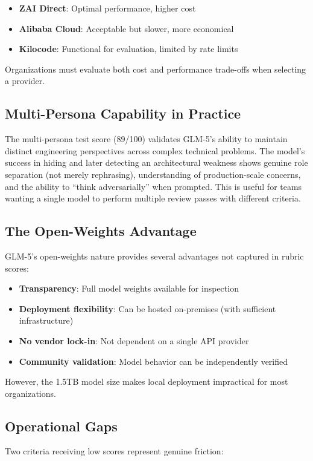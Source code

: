 \documentclass[conference]{IEEEtran}
\begin{document}
\begin{itemize}
    \item \textbf{ZAI Direct}: Optimal performance, higher cost
    \item \textbf{Alibaba Cloud}: Acceptable but slower, more economical
    \item \textbf{Kilocode}: Functional for evaluation, limited by rate limits
\end{itemize}

Organizations must evaluate both cost and performance trade-offs when selecting a provider.

\subsection{Multi-Persona Capability in Practice}
The multi-persona test score (89/100) validates GLM-5's ability to maintain distinct engineering perspectives across complex technical problems. The model's success in hiding and later detecting an architectural weakness shows genuine role separation (not merely rephrasing), understanding of production-scale concerns, and the ability to ``think adversarially'' when prompted. This is useful for teams wanting a single model to perform multiple review passes with different criteria.

\subsection{The Open-Weights Advantage}
GLM-5's open-weights nature provides several advantages not captured in rubric scores:

\begin{itemize}
    \item \textbf{Transparency}: Full model weights available for inspection
    \item \textbf{Deployment flexibility}: Can be hosted on-premises (with sufficient infrastructure)
    \item \textbf{No vendor lock-in}: Not dependent on a single API provider
    \item \textbf{Community validation}: Model behavior can be independently verified
\end{itemize}

However, the 1.5TB model size makes local deployment impractical for most organizations.

\subsection{Operational Gaps}
Two criteria receiving low scores represent genuine friction:
\end{document}
